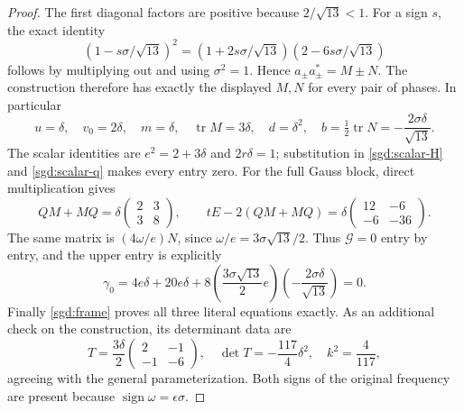 \begin{proof}
The first diagonal factors are positive because $2/\sqrt{13}<1$.
For a sign $s$, the exact identity
\[
 (1-s\sigma/\sqrt{13})^2
  =(1+2s\sigma/\sqrt{13})(2-6s\sigma/\sqrt{13})
\]
follows by multiplying out and using $\sigma^2=1$. Hence
$a_\pm a_\pm^*=M\pm N$. The construction therefore has exactly
the displayed $M,N$ for every pair of phases. In particular
\[
 u=\delta,\quad v_0=2\delta,\quad m=\delta,\quad
 \operatorname{tr} M=3\delta,\quad d=\delta^2,\quad
 b=\tfrac12\operatorname{tr} N=-\frac{2\sigma\delta}{\sqrt{13}}.
\]
The scalar identities are $e^2=2+3\delta$ and
$2r\delta=1$; substitution in \eqref{sgd:scalar-H} and
\eqref{sgd:scalar-q} makes every entry zero.
For the full Gauss block, direct multiplication gives
\[
 QM+MQ=\delta\begin{pmatrix}2&3\\3&8\end{pmatrix},\qquad
 tE-2(QM+MQ)
   =\delta\begin{pmatrix}12&-6\\-6&-36\end{pmatrix}.
\]
The same matrix is $(4\omega/e)N$, since
$\omega/e=3\sigma\sqrt{13}/2$. Thus $\mathcal G=0$ entry
by entry, and the upper entry is explicitly
\[
 \gamma_0=4e\delta+20e\delta
       +8\left(\frac{3\sigma\sqrt{13}}2e\right)
             \left(-\frac{2\sigma\delta}{\sqrt{13}}\right)=0.
\]
Finally \eqref{sgd:frame} proves all three literal equations exactly.
As an additional check on the construction, its determinant data are
\[
 T=\frac{3\delta}{2}\begin{pmatrix}2&-1\\-1&-6\end{pmatrix},\quad
 \det T=-\frac{117}{4}\delta^2,\quad k^2=\frac4{117},
\]
agreeing with the general parameterization. Both signs of the original
frequency are present because $\operatorname{sign}\omega=\epsilon\sigma$.
\end{proof}

